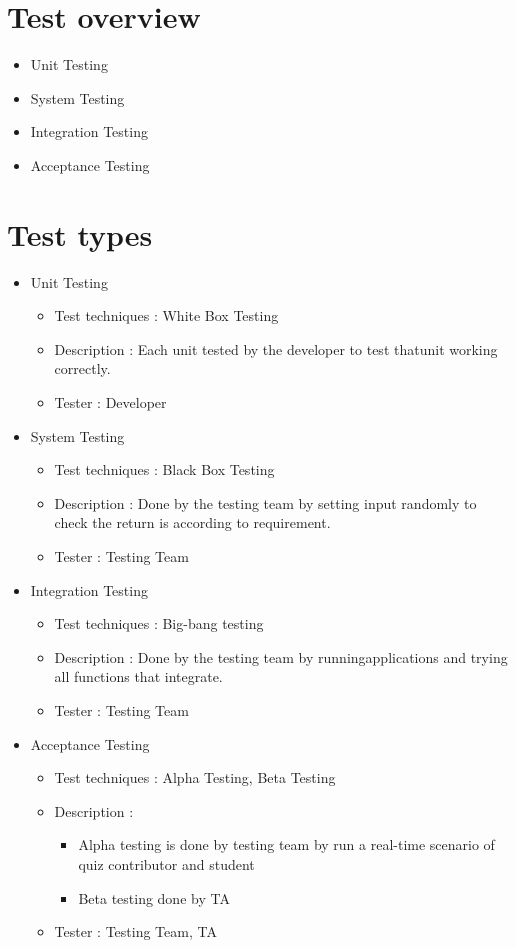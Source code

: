 \documentclass[ 10pt]{report}
\begin{document}
    \section{Test overview}
    \begin{itemize}
        \item Unit Testing
        \item System Testing
        \item Integration Testing
        \item Acceptance Testing
    \end{itemize}
    \section{Test types}
    \begin{itemize}
        \item Unit Testing \begin{itemize}
                \item Test techniques : White Box Testing
                \item Description : Each unit tested by the developer to test thatunit working correctly.
                \item Tester : Developer
            \end{itemize}
        \item System Testing \begin{itemize}
                \item Test techniques : Black Box Testing
                \item Description : Done by the testing team by setting input randomly to check the return is according to requirement.
                \item Tester : Testing Team
            \end{itemize}
        \item Integration Testing \begin{itemize}
                \item Test techniques : Big-bang testing
                \item Description : Done by the testing team by runningapplications and trying all functions that integrate.
                \item Tester : Testing Team
            \end{itemize}
        \item Acceptance Testing \begin{itemize}
                \item Test techniques : Alpha Testing, Beta Testing
                \item Description : \begin{itemize}
                    \item Alpha testing is done by testing team by run a real-time scenario of quiz contributor and student
                    \item Beta testing done by TA
                \end{itemize}
                \item Tester : Testing Team, TA
            \end{itemize}
    \end{itemize}
\end{document}
